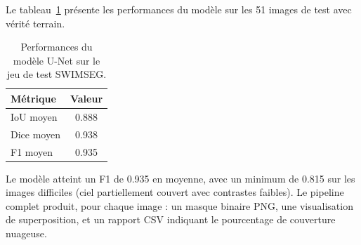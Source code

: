 Le tableau~\ref{tab:resultats_cv} présente les performances du modèle
sur les 51 images de test avec vérité terrain.

\begin{table}[H]
  \centering
  \caption{Performances du modèle U-Net sur le jeu de test SWIMSEG.}
  \label{tab:resultats_cv}
  \begin{tabular}{lc}
    \toprule
    \textbf{Métrique} & \textbf{Valeur} \\
    \midrule
    IoU moyen  & 0.888 \\
    Dice moyen & 0.938 \\
    F1 moyen   & 0.935 \\
    \bottomrule
  \end{tabular}
\end{table}

Le modèle atteint un F1 de 0.935 en moyenne, avec un minimum de 0.815
sur les images difficiles (ciel partiellement couvert avec contrastes
faibles). Le pipeline complet produit, pour chaque image : un masque
binaire PNG, une visualisation de superposition, et un rapport CSV
indiquant le pourcentage de couverture nuageuse.
